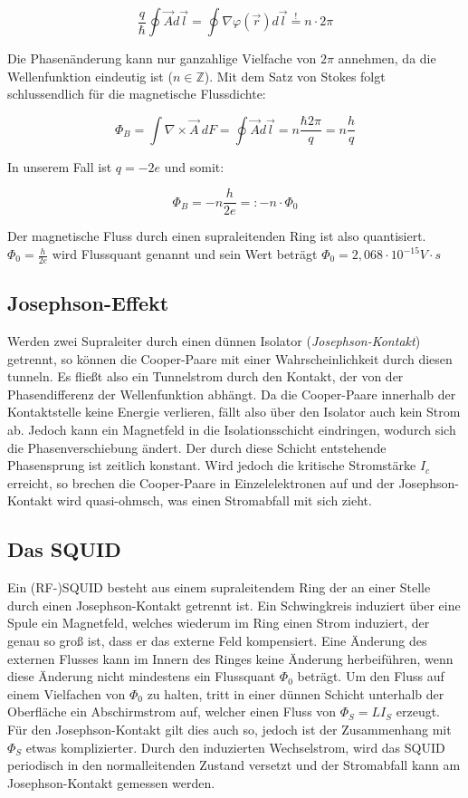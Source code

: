$$\frac{q}{\hbar}\oint \vec A d\vec l = \oint \nabla \varphi(\vec r) d\vec l \stackrel{!}{=} n\cdot2\pi$$

Die Phasenänderung kann nur ganzahlige Vielfache von $2\pi$ annehmen, da die Wellenfunktion eindeutig ist ($n \in \mathbb Z$). Mit dem Satz von Stokes folgt schlussendlich für die magnetische Flussdichte:

$$ \Phi_B = \int \nabla \times \vec A \ dF = \oint \vec A d\vec l = n\frac{\hbar 2\pi}{q} = n\frac{h}{q} $$

In unserem Fall ist $q=-2e$ und somit:

$$\Phi_B = -n\frac{h}{2e} =: -n\cdot \Phi_0$$

Der magnetische Fluss durch einen supraleitenden Ring ist also quantisiert. $\Phi_0 = \frac{h}{2e}$ wird Flussquant genannt und sein Wert beträgt $\Phi_0 = 2,068 \cdot 10^{-15} V\cdot s$

\subsection{Josephson-Effekt}

Werden zwei Supraleiter durch einen dünnen Isolator (\emph{Josephson-Kontakt}) getrennt, so können die Cooper-Paare mit einer Wahrscheinlichkeit durch diesen tunneln. Es fließt also ein Tunnelstrom durch den Kontakt, der von der Phasendifferenz der Wellenfunktion abhängt. Da die Cooper-Paare innerhalb der Kontaktstelle keine Energie verlieren,  fällt also über den Isolator auch kein Strom ab. Jedoch kann ein Magnetfeld in die Isolationsschicht eindringen, wodurch sich die Phasenverschiebung ändert. Der durch diese Schicht entstehende Phasensprung ist zeitlich konstant. Wird jedoch die kritische Stromstärke $I_c$ erreicht, so brechen die Cooper-Paare in Einzelelektronen auf und der Josephson-Kontakt wird quasi-ohmsch, was einen Stromabfall mit sich zieht.

\subsection{Das SQUID}

Ein (RF-)SQUID besteht aus einem supraleitendem Ring der an einer Stelle durch einen Josephson-Kontakt getrennt ist. Ein Schwingkreis induziert über eine Spule ein Magnetfeld, welches wiederum im Ring einen Strom induziert, der genau so groß ist, dass er das externe Feld kompensiert. Eine Änderung des externen Flusses kann im Innern des Ringes keine Änderung herbeiführen, wenn diese Änderung nicht mindestens ein Flussquant $\Phi_0$ beträgt. Um den Fluss auf einem Vielfachen von $\Phi_0$ zu halten, tritt in einer dünnen Schicht unterhalb der Oberfläche ein Abschirmstrom auf, welcher einen Fluss von $\Phi_S = LI_S$ erzeugt. Für den Josephson-Kontakt gilt dies auch so, jedoch ist der Zusammenhang mit $\Phi_S$ etwas komplizierter. Durch den induzierten Wechselstrom, wird das SQUID periodisch in den normalleitenden Zustand versetzt und der Stromabfall kann am Josephson-Kontakt gemessen werden.

